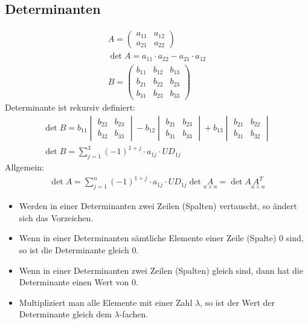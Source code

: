 \subsection{Determinanten}
\begin{gather}
  A = \begin{pmatrix}a_{11} & a_{12} \\ a_{21} & a_{22}\end{pmatrix} \\
  \det{A} = a_{11}\cdot a_{22}- a_{21}\cdot a_{12} \\
  B = \begin{pmatrix}
	b_{11} & b_{12} & b_{13} \\
	b_{21} & b_{22} & b_{23} \\
	b_{31} & b_{23} & b_{33}
      \end{pmatrix}
\end{gather}
Determinante ist rekursiv definiert:
\begin{gather}
  \det{B} = b_{11}\begin{vmatrix}b_{22}&b_{23}\\b_{32}&b_{33}\end{vmatrix}
          - b_{12}\begin{vmatrix}b_{21}&b_{23}\\b_{31}&b_{33}\end{vmatrix}
          + b_{13}\begin{vmatrix}b_{21}&b_{22}\\b_{31}&b_{32}\end{vmatrix} \\
  \det{B} = \sum_{j=1}^3 {(-1)}^{1+j}\cdot a_{1j}\cdot UD_{1j}
\end{gather}
Allgemein:
\begin{gather}
  \det{A} = \sum_{j=1}^n {(-1)}^{1+j}\cdot a_{1j} \cdot UD_{1j}
  \det{\underset{n\times n}{A}} = \det{A\underset{n\times n}{A^T}}
\end{gather}
\begin{itemize}
  \item Werden in einer Determinanten zwei Zeilen (Spalten) vertauscht, so \"andert
	sich das Vorzeichen.
  \item Wenn in einer Determinanten s\"amtliche Elemente einer Zeile (Spalte) 0
	sind, so ist die Determinante gleich 0.
  \item Wenn in einer Determinanten zwei Zeilen (Spalten) gleich sind, dann hat die
	Determinante einen Wert von 0.
  \item Multipliziert man alle Elemente mit einer Zahl $\lambda$, so ist der
	Wert der Determinante gleich dem $\lambda$-fachen.
\end{itemize}
